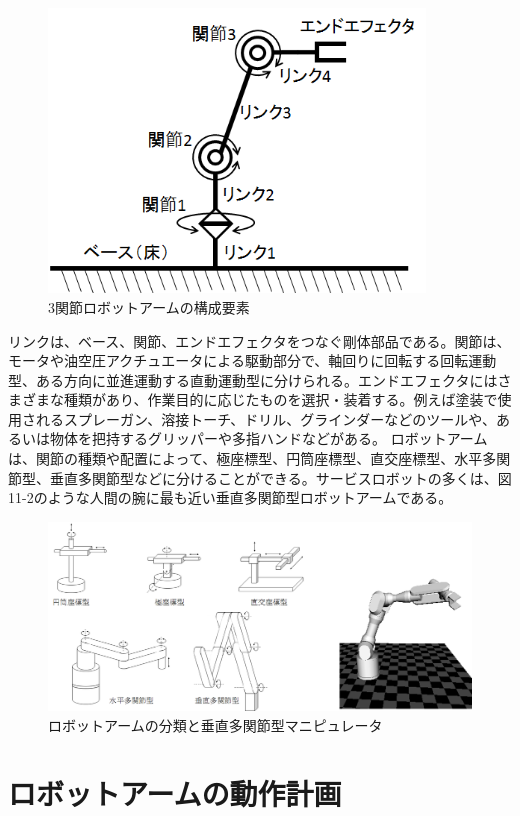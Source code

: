 \begin{figure}[htp]
  \centering
  \includegraphics[width=10cm]{pictures/chapter11/pic_11_01.png}
  \caption{3関節ロボットアームの構成要素}
\end{figure}

リンクは、ベース、関節、エンドエフェクタをつなぐ剛体部品である。関節は、モータや油空圧アクチュエータによる駆動部分で、軸回りに回転する回転運動型、ある方向に並進運動する直動運動型に分けられる。エンドエフェクタにはさまざまな種類があり、作業目的に応じたものを選択・装着する。例えば塗装で使用されるスプレーガン、溶接トーチ、ドリル、グラインダーなどのツールや、あるいは物体を把持するグリッパーや多指ハンドなどがある。
ロボットアームは、関節の種類や配置によって、極座標型、円筒座標型、直交座標型、水平多関節型、垂直多関節型などに分けることができる。サービスロボットの多くは、図11-2のような人間の腕に最も近い垂直多関節型ロボットアームである。

\begin{figure}[htp]
  \centering
  \includegraphics[width=12cm]{pictures/chapter11/pic_11_02.png}
  \caption{ロボットアームの分類と垂直多関節型マニピュレータ}
\end{figure}

\section{ロボットアームの動作計画}

